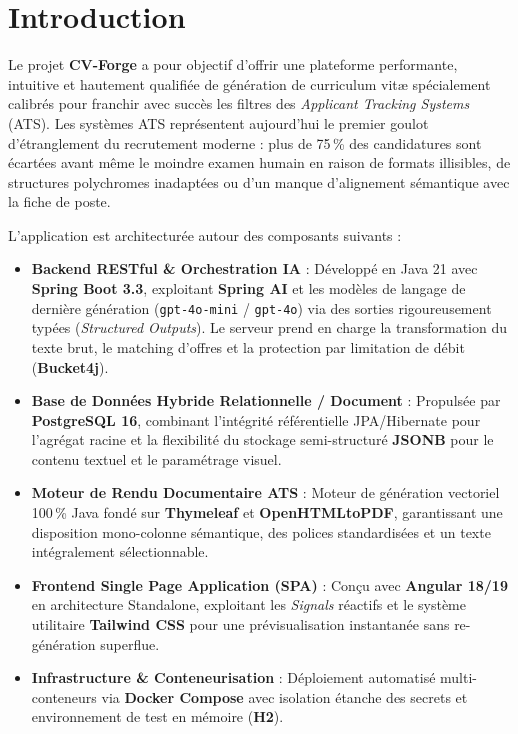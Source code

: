 \documentclass[11pt,a4paper]{article}
\begin{document}
\section{Introduction}

Le projet \textbf{CV-Forge} a pour objectif d'offrir une plateforme performante, intuitive et hautement qualifiée de génération de curriculum vitæ spécialement calibrés pour franchir avec succès les filtres des \textit{Applicant Tracking Systems} (ATS). Les systèmes ATS représentent aujourd'hui le premier goulot d'étranglement du recrutement moderne : plus de 75\,\% des candidatures sont écartées avant même le moindre examen humain en raison de formats illisibles, de structures polychromes inadaptées ou d'un manque d'alignement sémantique avec la fiche de poste.

L'application est architecturée autour des composants suivants :
\begin{itemize}
    \item \textbf{Backend RESTful \& Orchestration IA} : Développé en Java 21 avec \textbf{Spring Boot 3.3}, exploitant \textbf{Spring AI} et les modèles de langage de dernière génération (\texttt{gpt-4o-mini} / \texttt{gpt-4o}) via des sorties rigoureusement typées (\textit{Structured Outputs}). Le serveur prend en charge la transformation du texte brut, le matching d'offres et la protection par limitation de débit (\textbf{Bucket4j}).
    \item \textbf{Base de Données Hybride Relationnelle / Document} : Propulsée par \textbf{PostgreSQL 16}, combinant l'intégrité référentielle JPA/Hibernate pour l'agrégat racine et la flexibilité du stockage semi-structuré \textbf{JSONB} pour le contenu textuel et le paramétrage visuel.
    \item \textbf{Moteur de Rendu Documentaire ATS} : Moteur de génération vectoriel 100\,\% Java fondé sur \textbf{Thymeleaf} et \textbf{OpenHTMLtoPDF}, garantissant une disposition mono-colonne sémantique, des polices standardisées et un texte intégralement sélectionnable.
    \item \textbf{Frontend Single Page Application (SPA)} : Conçu avec \textbf{Angular 18/19} en architecture Standalone, exploitant les \textit{Signals} réactifs et le système utilitaire \textbf{Tailwind CSS} pour une prévisualisation instantanée sans re-génération superflue.
    \item \textbf{Infrastructure \& Conteneurisation} : Déploiement automatisé multi-conteneurs via \textbf{Docker Compose} avec isolation étanche des secrets et environnement de test en mémoire (\textbf{H2}).
\end{itemize}
\end{document}

